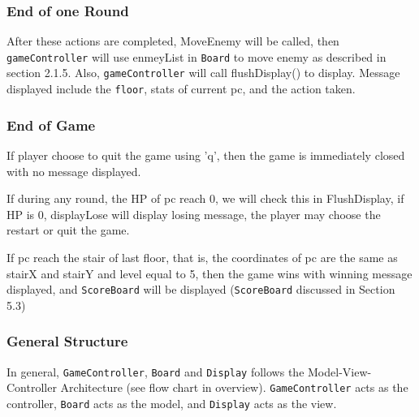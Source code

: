 \documentclass[11pt]{article}
\theoremstyle{plain} \newtheorem{theorem*}{Theorem}[subsection]
\begin{document}
\subsubsection{End of one Round}

After these actions are completed, \textsf{MoveEnemy} will be called,
then \texttt{gameController} will use \textsf{enmeyList} in \texttt{Board}
to move enemy as described in section 2.1.5. Also, \texttt{gameController}
will call \textsf{flushDisplay()} to display. Message displayed include
the \texttt{floor}, stats of current \textsf{pc}, and the action taken.\\

\subsubsection{End of Game}

If player choose to quit the game using 'q', then the game is immediately 
closed with no message displayed.

If during any round, the HP of \textsf{pc} reach 0, we will check this
in \textsf{FlushDisplay}, if HP is 0, \textsf{displayLose} will display
losing message, the player may choose the restart or quit the game.

If \textsf{pc} reach the stair of last floor, that is, the coordinates of
\textsf{pc} are the same as \textsf{stairX} and \textsf{stairY} and 
\textsf{level} equal to 5, then the game wins with winning message displayed,
and \texttt{ScoreBoard} will be displayed (\texttt{ScoreBoard} discussed in
Section 5.3)

\subsubsection{General Structure}
In general, \texttt{GameController}, \texttt{Board} and \texttt{Display} 
follows the Model-View-Controller Architecture (see flow chart in overview). 
\texttt{GameController} acts as the controller, \texttt{Board} acts as the model, 
and \texttt{Display} acts as the view.










\end{document}
